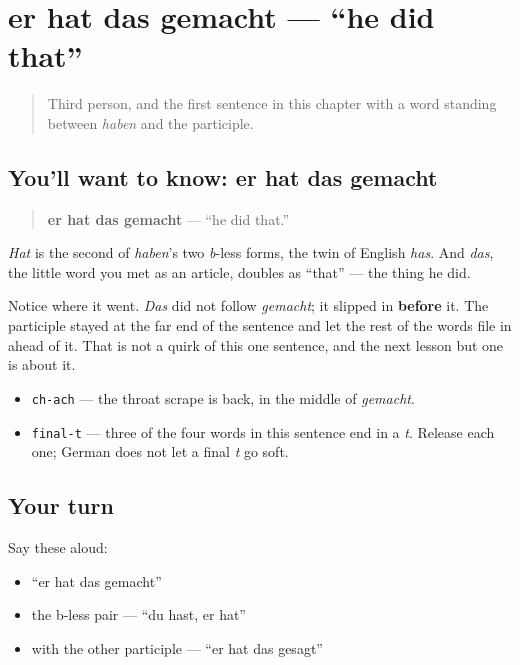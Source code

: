 \section[er hat das gemacht]{er hat das gemacht — \textquotedblleft{}he did that\textquotedblright{}}

\label{lesson:GE-C15-er-hat-gemacht}



\begin{quote}
Third person, and the first sentence in this chapter with a word standing between \emph{haben} and the participle.
\end{quote}

\subsection*{You'll want to know: er hat das gemacht}
\begin{quote}
\textbf{er hat das gemacht} — \textquotedblleft{}he did that.\textquotedblright{}
\end{quote}

\emph{Hat} is the second of \emph{haben}'s two \emph{b}-less forms, the twin of English \emph{has}. And \emph{das}, the little word you met as an article, doubles as \textquotedblleft{}that\textquotedblright{} — the thing he did.

Notice where it went. \emph{Das} did not follow \emph{gemacht}; it slipped in \textbf{before} it. The participle stayed at the far end of the sentence and let the rest of the words file in ahead of it. That is not a quirk of this one sentence, and the next lesson but one is about it.

\begin{sounds}
\begin{itemize}
\raggedright
  \item \texttt{ch-ach} — the throat scrape is back, in the middle of \emph{gemacht}.
  \item \texttt{final-t} — three of the four words in this sentence end in a \emph{t}. Release each one; German does not let a final \emph{t} go soft.
\end{itemize}
\end{sounds}

\subsection*{Your turn}
Say these aloud:

\begin{itemize}
\raggedright
  \item \textquotedblleft{}er hat das gemacht\textquotedblright{}
  \item the b-less pair — \textquotedblleft{}du hast, er hat\textquotedblright{}
  \item with the other participle — \textquotedblleft{}er hat das gesagt\textquotedblright{}
\end{itemize}

